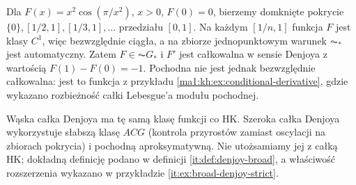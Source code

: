 \begin{przyklad}
Dla $F(x)=x^2\cos(\pi/x^2)$, $x>0$, $F(0)=0$, bierzemy domknięte pokrycie $\{0\},[1/2,1],[1/3,1],\dots$ przedziału $[0,1]$. Na każdym $[1/n,1]$ funkcja $F$ jest klasy $C^1$, więc bezwzględnie ciągła, a na zbiorze jednopunktowym warunek $\AC_*$ jest automatyczny. Zatem $F\in\AC G_*$ i $F'$ jest całkowalna w sensie Denjoya z wartością $F(1)-F(0)=-1$. Pochodna nie jest jednak bezwzględnie całkowalna:
jest to funkcja z przykładu \ref{ma1:kh:ex:conditional-derivative},
gdzie wykazano rozbieżność całki Lebesgue'a modułu pochodnej.
\end{przyklad}
\begin{uwaga}
Wąska całka Denjoya ma tę samą klasę funkcji co HK. Szeroka całka Denjoya wykorzystuje słabszą klasę $ACG$ (kontrola przyrostów zamiast oscylacji na zbiorach pokrycia) i pochodną aproksymatywną. Nie utożsamiamy jej z całką HK; dokładną definicję podano w definicji \ref{it:def:denjoy-broad}, a właściwość rozszerzenia wykazano w przykładzie \ref{it:ex:broad-denjoy-strict}.
\end{uwaga}


